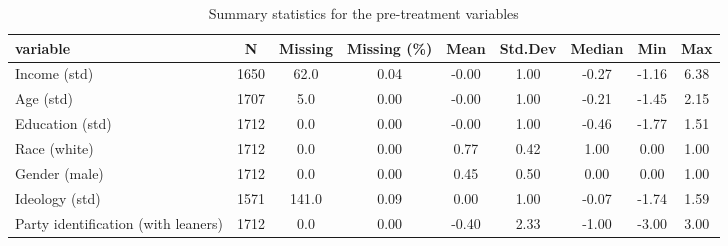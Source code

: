 \begin{table}[th!]
\centering
\caption{Summary statistics for the pre-treatment variables}
\label{tab-covar-summary.tex}
\begin{tabular}{p{3cm}cccccccc}
\toprule
                           variable &    N &  Missing &  Missing (\%) &  Mean &  Std.Dev &  Median &   Min &  Max \\
\midrule
                       Income (std) & 1650 &     62.0 &         0.04 & -0.00 &     1.00 &   -0.27 & -1.16 & 6.38 \\
                          Age (std) & 1707 &      5.0 &         0.00 & -0.00 &     1.00 &   -0.21 & -1.45 & 2.15 \\
                    Education (std) & 1712 &      0.0 &         0.00 & -0.00 &     1.00 &   -0.46 & -1.77 & 1.51 \\
                       Race (white) & 1712 &      0.0 &         0.00 &  0.77 &     0.42 &    1.00 &  0.00 & 1.00 \\
                      Gender (male) & 1712 &      0.0 &         0.00 &  0.45 &     0.50 &    0.00 &  0.00 & 1.00 \\
                     Ideology (std) & 1571 &    141.0 &         0.09 &  0.00 &     1.00 &   -0.07 & -1.74 & 1.59 \\
Party identification (with leaners) & 1712 &      0.0 &         0.00 & -0.40 &     2.33 &   -1.00 & -3.00 & 3.00 \\
\bottomrule
\end{tabular}
\end{table}
